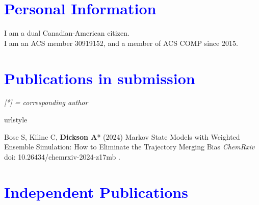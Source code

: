\documentclass[margin,line]{res}
\begin{document}
\begin{resume}
\section{\sc \textcolor{blue}{ Personal Information}}
I am a dual Canadian-American citizen.\\
I am an ACS member 30919152, and a member of ACS COMP since 2015.

\newpage
\section{\sc \textcolor{blue}{Publications in submission}}


\emph{[*] = corresponding author}
\vspace {0.05in}

\begingroup
\begin{spacing}{1.2}
\renewcommand{\section}[2]{}%
\begin{thebibliography}{10}
\providecommand{\url}[1]{\texttt{#1}}
\providecommand{\urlprefix}{URL }
\expandafter\ifx\csname urlstyle\endcsname\relax
  \providecommand{\doi}[1]{doi:\discretionary{}{}{}#1}\else
  \providecommand{\doi}{doi:\discretionary{}{}{}\begingroup
  \urlstyle{rm}\Url}\fi
\providecommand{\bibAnnoteFile}[1]{%
  \IfFileExists{#1}{\begin{quotation}\noindent\textsc{Key:} #1\\
  \textsc{Annotation:}\ \end{quotation}}{}}
\providecommand{\bibAnnote}[2]{%
  \begin{quotation}\noindent\textsc{Key:} #1\\
  \textsc{Annotation:}\ #2\end{quotation}}
\providecommand{\eprint}[2][]{\url{#2}}

\setlength{\itemsep}{0.15in}

  Bose S, Kilinc C, {\bf Dickson A}* (2024) Markov State Models with Weighted Ensemble Simulation: How to Eliminate the Trajectory Merging Bias 
  \newblock \textit{ChemRxiv} doi: 10.26434/chemrxiv-2024-z17mb . 

\end{thebibliography}
\end{spacing}
\endgroup

\section{\sc \textcolor{blue}{Independent Publications}}


\end{resume}
\end{document}
